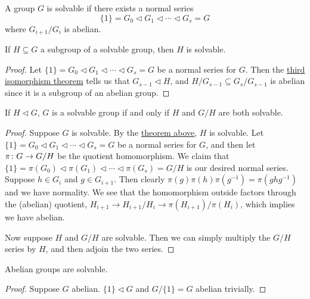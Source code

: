 \begin{definition}
    A group \(G\) is solvable if there exists a normal series
    \begin{equation*}
        \{1\} = G_0 \lhd G_1 \lhd \cdots \lhd G_s = G
    \end{equation*}
    where \(G_{i+1}/G_i\) is abelian.
\end{definition}
\begin{theorem}\label{thm:subgroup-solvable}
    If \(H \subseteq G\) a subgroup of a solvable group,
    then \(H\) is solvable.
\end{theorem}
\begin{proof}
    Let \(\{1\} = G_0 \lhd G_1 \lhd \cdots \lhd G_s = G\) be a normal series for \(G\).
    Then the \hyperref[thm:iso-3-group]{third isomorphism theorem}
    tells us that \(G_{s-1} \lhd H\),
    and \(H/G_{s-1} \subseteq G_s/G_{s-1}\) is abelian
    since it is a subgroup of an abelian group.
\end{proof}
\begin{theorem}\label{thm:normal-subgroup-solvable}
    If \(H \lhd G\),
    \(G\) is a solvable group if and only if \(H\) and \(G/H\) are both solvable.
\end{theorem}
\begin{proof}
    Suppose \(G\) is solvable.
    By the \hyperref[thm:subgroup-solvable]{theorem above},
    \(H\) is solvable.
    Let \(\{1\} = G_0 \lhd G_1 \lhd \cdots \lhd G_s = G\) be a normal series for \(G\),
    and then let \(\pi\colon G\to G/H\) be the quotient homomorphism.
    We claim that \(\{1\} = \pi(G_0) \lhd \pi(G_1) \lhd \cdots \lhd \pi(G_s) = G/H\)
    is our desired normal series.
    Suppose \(h \in G_i\) and \(g \in G_{i+1}\).
    Then clearly \(\pi(g)\pi(h)\pi(g^{-1}) = \pi(ghg^{-1})\) and we have normality.
    We see that the homomorphism outside factors through the (abelian) quotient,
    \(H_{i+1} \to H_{i+1}/H_i \to \pi(H_{i+1})/\pi(H_i)\),
    which implies we have abelian.

    Now suppose \(H\) and \(G/H\) are solvable.
    Then we can simply multiply the \(G/H\) series by \(H\),
    and then adjoin the two series.
\end{proof}

\begin{lemma}\label{lem:abelian-solvable}
    Abelian groups are solvable.
\end{lemma}
\begin{proof}
    Suppose \(G\) abelian.
    \(\{1\} \lhd G\) and \(G/\{1\} = G\) abelian trivially.
\end{proof}

